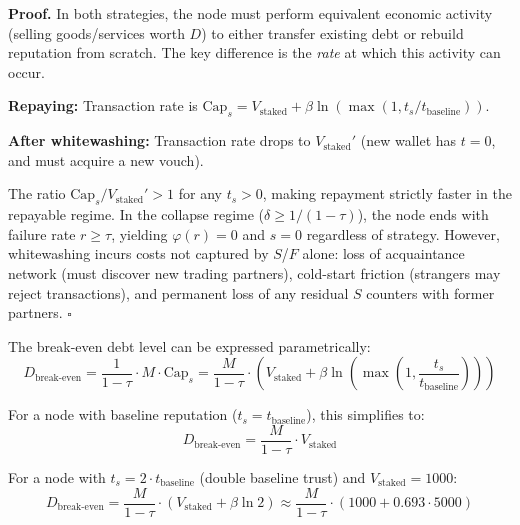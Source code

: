 \documentclass[11pt]{article}
\newcommand{\qed}{\hfill}
\newenvironment{proof}{\noindent\textbf{Proof.}}{\qed$\square$\par\medskip}
\begin{document}
\begin{proof}
In both strategies, the node must perform equivalent economic activity (selling goods/services worth $D$) to either transfer existing debt or rebuild reputation from scratch. The key difference is the \emph{rate} at which this activity can occur.

\textbf{Repaying:} Transaction rate is $\text{Cap}_s = V_{\text{staked}} + \beta \ln(\max(1, t_s / t_{\text{baseline}}))$.

\textbf{After whitewashing:} Transaction rate drops to $V_{\text{staked}}'$ (new wallet has $t = 0$, and must acquire a new vouch).

The ratio $\text{Cap}_s / V_{\text{staked}}' > 1$ for any $t_s > 0$, making repayment strictly faster in the repayable regime. In the collapse regime ($\delta \geq 1/(1-\tau)$), the node ends with failure rate $r \geq \tau$, yielding $\varphi(r) = 0$ and $s = 0$ regardless of strategy. However, whitewashing incurs costs not captured by $S$/$F$ alone: loss of acquaintance network (must discover new trading partners), cold-start friction (strangers may reject transactions), and permanent loss of any residual $S$ counters with former partners. \qed
\end{proof}

The break-even debt level can be expressed parametrically:
\begin{equation}\label{eq:breakeven}
    D_{\text{break-even}} = \frac{1}{1-\tau} \cdot M \cdot \text{Cap}_s = \frac{M}{1-\tau} \cdot \left( V_{\text{staked}} + \beta \ln\left(\max\left(1, \frac{t_s}{t_{\text{baseline}}}\right)\right) \right)
\end{equation}

For a node with baseline reputation ($t_s = t_{\text{baseline}}$), this simplifies to:
\begin{equation}
    D_{\text{break-even}} = \frac{M}{1-\tau} \cdot V_{\text{staked}}
\end{equation}

For a node with $t_s = 2 \cdot t_{\text{baseline}}$ (double baseline trust) and $V_{\text{staked}} = 1000$:
\begin{equation}
    D_{\text{break-even}} = \frac{M}{1-\tau} \cdot (V_{\text{staked}} + \beta \ln 2) \approx \frac{M}{1-\tau} \cdot (1000 + 0.693 \cdot 5000)
\end{equation}
\end{document}

